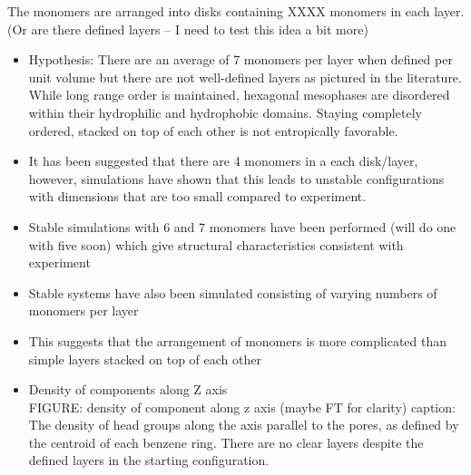 \documentclass{article}
\begin{document}
	The monomers are arranged into disks containing XXXX monomers in each layer. (Or are there defined layers -- I need to test this idea a bit more) 
	\begin{itemize}
		\item Hypothesis: There are an average of 7 monomers per layer when defined per unit volume but there are not well-defined layers as pictured in the literature. While long range order is maintained, hexagonal mesophases are disordered within their hydrophilic and hydrophobic domains. Staying completely ordered, stacked on top of each other is not entropically favorable.
		\item It has been suggested that there are 4 monomers in a each disk/layer, however, simulations have shown that this leads to unstable configurations with dimensions that are too small compared to experiment.
		\item Stable simulations with 6 and 7 monomers have been performed (will do one with five soon) which give structural characteristics consistent with experiment
		\item Stable systems have also been simulated consisting of varying numbers of monomers per layer
		\item This suggests that the arrangement of monomers is more complicated than simple layers stacked on top of each other
		\item Density of components along Z axis \\
		FIGURE: density of component along z axis (maybe FT for clarity)
		caption: The density of head groups along the axis parallel to the pores, as defined by the centroid of each benzene ring. 
There are no clear layers despite the defined layers in the starting configuration.
		
	\end{itemize}
	
\end{document}
